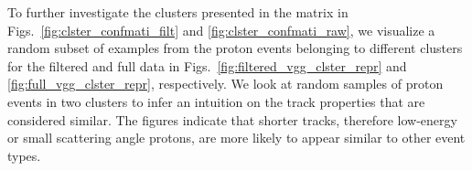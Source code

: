 \documentclass[preprint,12pt]{elsarticle}
\begin{document}
To further investigate the clusters presented in the matrix in Figs.~\ref{fig:clster_confmati_filt} and \ref{fig:clster_confmati_raw}, we visualize a random subset of examples from the proton events belonging to different clusters for the filtered and full data in Figs.~\ref{fig:filtered_vgg_clster_repr} and \ref{fig:full_vgg_clster_repr}, respectively.
We look at random samples of proton events in two clusters to infer an intuition on the track properties that are considered similar.
The figures indicate that shorter tracks, therefore low-energy or small scattering angle protons, are more likely to appear similar to other event types.
\end{document}
